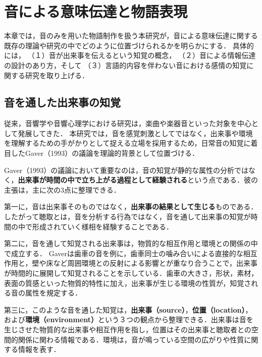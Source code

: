 
\section{音による意味伝達と物語表現}
本章では，音のみを用いた物語制作を扱う本研究が，音による意味伝達に関する既存の理論や研究の中でどのように位置づけられるかを明らかにする．
具体的には，
（１）音が出来事を伝えるという知覚の概念，
（２）音による情報伝達の設計のあり方，そして
（３）言語的内容を伴わない音における感情の知覚に関する研究を取り上げる．


\subsection{音を通した出来事の知覚}

従来，音響学や音響心理学における研究は，楽曲や楽器音といった対象を中心として発展してきた．
本研究では，音を感覚刺激としてではなく，出来事や環境を理解するための手がかりとして捉える立場を採用するため，日常音の知覚に着目したGaver（1993）\cite{gaver_what_1993}の議論を理論的背景として位置づける．


Gaver（1993）の議論において重要なのは，音の知覚が静的な属性の分析ではなく，\textbf{出来事が時間の中で立ち上がる過程として経験される}という点である．彼の主張は，主に次の3点に整理できる．

第一に，音は出来事そのものではなく，\textbf{出来事の結果として生じる}ものである．
したがって聴取とは，音を分析する行為ではなく，音を通して出来事の知覚が時間の中で形成されていく様相を経験することである．

第二に，音を通して知覚される出来事は，物質的な相互作用と環境との関係の中で成立する．
Gaverは歯車の音を例に，歯車同士の噛み合いによる直接的な相互作用と，壁や床など周囲環境との反射による影響とが重なり合うことで，出来事が時間的に展開して知覚されることを示している．歯車の大きさ，形状，素材，表面の質感といった物質的特性に加え，出来事が生じる環境の性質が，知覚される音の属性を規定する．

第三に，このような音を通した知覚は，\textbf{出来事（source）}，\textbf{位置（location）}，および\textbf{環境（environment）}という３つの観点から整理できる．出来事は音を生じさせた物質的な出来事や相互作用を指し，位置はその出来事と聴取者との空間的関係に関わる情報である．環境は，音が鳴っている空間の広がりや性質に関する情報を表す．

